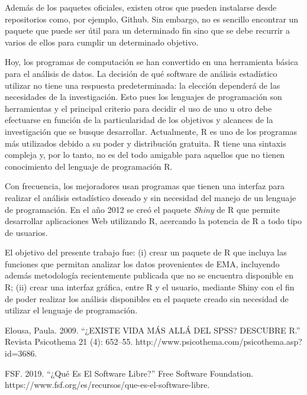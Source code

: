 Además de los paquetes oficiales, existen otros que pueden instalarse desde repositorios como, por ejemplo, Github. Sin embargo, no es sencillo encontrar un paquete que puede ser útil para un determinado fin sino que se debe recurrir a varios de ellos para cumplir un determinado objetivo. 


Hoy, los programas de computación se han convertido en una herramienta básica para el análisis de datos. La decisión de qué software de análisis estadístico utilizar no tiene una respuesta predeterminada: la elección dependerá de las necesidades de la investigación. Esto pues los lenguajes de programación son herramientas y el principal criterio para decidir el uso de uno u otro debe efectuarse en función de la particularidad de los objetivos y alcances de la investigación que se busque desarrollar. Actualmente, R es uno de los programas más utilizados debido a su poder y distribución gratuita. R tiene una sintaxis compleja y, por lo tanto, no es del todo amigable para aquellos que no tienen conocimiento del lenguaje de programación R.

Con frecuencia, los mejoradores usan programas que tienen una interfaz para realizar el análisis estadístico deseado y sin necesidad del manejo de un lenguaje de programación. En el año 2012 se creó el paquete \emph{Shiny} de R que permite desarrollar aplicaciones Web utilizando R, acercando la potencia de R a todo tipo de usuarios.


El objetivo del presente trabajo fue: (i) crear un paquete de R que incluya las funciones que permitan analizar los datos provenientes de EMA, incluyendo además metodología recientemente publicada que no se encuentra disponible en R; (ii) crear una interfaz gráfica, entre R y el usuario, mediante Shiny con el fin de poder realizar los análisis disponibles en el paquete creado sin necesidad de utilizar el lenguaje de programación.



Elousa, Paula. 2009. “¿EXISTE VIDA MÁS ALLÁ DEL SPSS? DESCUBRE R.” Revista Psicothema 21 (4): 652–55. http://www.psicothema.com/psicothema.asp?id=3686.

FSF. 2019. “¿Qué Es El Software Libre?” Free Software Foundation. https://www.fsf.org/es/recursos/que-es-el-software-libre.